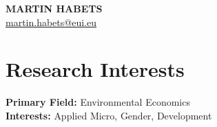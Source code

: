 \documentclass[11pt]{article}
\begin{document}

\begin{center}
    \textbf{\Large \textbf{MARTIN HABETS}} \\ \vspace{2pt} %
    \href{mailto:martin.habets@eui.eu}{martin.habets@eui.eu} \
\end{center}



\begin{comment}
This CV was written for specifically for positions I was applying for in
academia, and then modified to be a template.

A standard CV is about two pages long where as a resume in the US is one page.
sections can be added and removed here with this in mind. In my experience, 
education, and applicable work experience and skills are the most import things
to include on a resume. For a CV the Europass CV suggests the categories: Work
Experience, Education and Training, Language Skills, Digital Skills,
Communication and Interpersonal Skills, Conferences and Seminars, Creative Works
Driver's License, Hobbies and Interests, Honors and Awards, Management and
Leadership Skills, Networks and Memberships, Organizational Skills, Projects,
Publications, Recommendations, Social and Political Activities, Volunteering.

Your goal is to convey a who, what , when, where, why for every item you share. 
The who is obviously you, but I believe the rest should be done in that order.
For example below. An employer cares most about the degree held and typically 
less about the institution or where it is located (This is still good 
information though). Whatever order you choose be consistent throughout.
\end{comment}


\section{Research Interests}
 \begin{itemize}[leftmargin=0.5cm, label={}]
    \small{\item{
     \textbf{Primary Field: }{Environmental Economics} \\
     \textbf{Interests: }{Applied Micro, Gender, Development} 
    }}
 \end{itemize}
\end{document}
